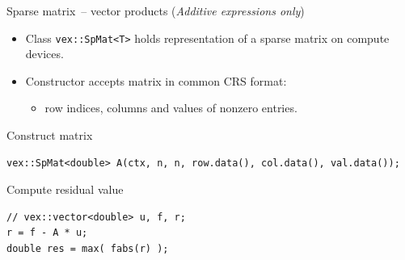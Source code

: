 \documentclass[@BEAMER_OPTIONS@]{beamer}
\newcommand{\code}[1]{\lstinline|#1|}
\newcommand{\additive}{\hspace{1cm}\footnotesize(\emph{Additive expressions only})}
\begin{document}
\begin{frame}[fragile]{Sparse matrix~-- vector products \additive}
    \begin{itemize}
        \item Class \code{vex::SpMat<T>} holds representation of a sparse
            matrix on compute devices.
        \item Constructor accepts matrix in common CRS format:
            \begin{itemize}
                \item row indices, columns and values of nonzero entries.
            \end{itemize}
    \end{itemize}
    \begin{exampleblock}{Construct matrix}
        \begin{lstlisting}
vex::SpMat<double> A(ctx, n, n, row.data(), col.data(), val.data());
        \end{lstlisting}
    \end{exampleblock}

    \begin{exampleblock}{Compute residual value}
        \begin{lstlisting}[firstnumber=last]
// vex::vector<double> u, f, r;
r = f - A * u;
double res = max( fabs(r) );
        \end{lstlisting}
    \end{exampleblock}
\end{frame}

\end{document}
